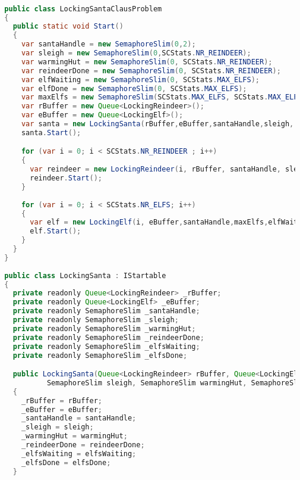\begin{lstlisting}[label=lst:impl_santa_lock,
  caption={Lock Based Santa Claus Implementation},
  language=Java,  
  showspaces=false,
  showtabs=false,
  breaklines=true,
  showstringspaces=false,
  breakatwhitespace=true,
  commentstyle=\color{greencomments},
  keywordstyle=\color{bluekeywords},
  stringstyle=\color{redstrings},
  escapechar=~,
  morekeywords={atomic, retry, orelse, var, get, set, ref, out, readonly, virtual, override, lock}]  % Start your code-block

  public class LockingSantaClausProblem
  {
    public static void Start()
    {
      var santaHandle = new SemaphoreSlim(0,2); 
      var sleigh = new SemaphoreSlim(0,SCStats.NR_REINDEER);
      var warmingHut = new SemaphoreSlim(0, SCStats.NR_REINDEER);
      var reindeerDone = new SemaphoreSlim(0, SCStats.NR_REINDEER);
      var elfWaiting = new SemaphoreSlim(0, SCStats.MAX_ELFS);
      var elfDone = new SemaphoreSlim(0, SCStats.MAX_ELFS);
      var maxElfs = new SemaphoreSlim(SCStats.MAX_ELFS, SCStats.MAX_ELFS);
      var rBuffer = new Queue<LockingReindeer>();
      var eBuffer = new Queue<LockingElf>();
      var santa = new LockingSanta(rBuffer,eBuffer,santaHandle,sleigh, warmingHut,reindeerDone,elfWaiting, elfDone);
      santa.Start();

      for (var i = 0; i < SCStats.NR_REINDEER ; i++)
      {
        var reindeer = new LockingReindeer(i, rBuffer, santaHandle, sleigh, warmingHut, reindeerDone);
        reindeer.Start();
      }
            
      for (var i = 0; i < SCStats.NR_ELFS; i++)
      {
        var elf = new LockingElf(i, eBuffer,santaHandle,maxElfs,elfWaiting,elfDone);
        elf.Start();
      }
    }
  }
  
  public class LockingSanta : IStartable
  {
    private readonly Queue<LockingReindeer> _rBuffer;
    private readonly Queue<LockingElf> _eBuffer;
    private readonly SemaphoreSlim _santaHandle;
    private readonly SemaphoreSlim _sleigh;
    private readonly SemaphoreSlim _warmingHut;
    private readonly SemaphoreSlim _reindeerDone;
    private readonly SemaphoreSlim _elfsWaiting;
    private readonly SemaphoreSlim _elfsDone;

    public LockingSanta(Queue<LockingReindeer> rBuffer, Queue<LockingElf> eBuffer, SemaphoreSlim santaHandle,
            SemaphoreSlim sleigh, SemaphoreSlim warmingHut, SemaphoreSlim reindeerDone, SemaphoreSlim elfsWaiting, SemaphoreSlim elfsDone)
    {
      _rBuffer = rBuffer;
      _eBuffer = eBuffer;
      _santaHandle = santaHandle;
      _sleigh = sleigh;
      _warmingHut = warmingHut;
      _reindeerDone = reindeerDone;
      _elfsWaiting = elfsWaiting;
      _elfsDone = elfsDone;
    }


\end{lstlisting}
